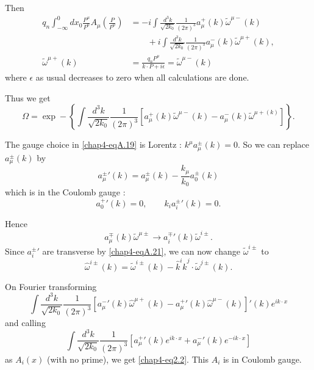 Then
\begin{align*}
  q_n \int^0_{-\infty} dx_0 \frac{P^\mu}{P^0} A_\mu \left( \frac{P}{P^0}\right) & = -i \int \frac{d^3k}{\sqrt{2k_0}} \frac{1}{(2 \pi)^3} a_\mu^+ (k) \tilde{\omega}^{\mu -} (k)\\
  & \qquad + i \int \frac{d^3k}{\sqrt{2k_0}} \frac{1}{(2 \pi)^3} a_\mu^- (k) \tilde{\omega}^{\mu +}(k), \label{chap4-eqA.17}\tag{A.17}\\
  \tilde{\omega}^{\mu +} (k) & = \frac{q_n P^\mu}{k \cdot P + i\epsilon} = {\tilde{\omega}}^{\mu -} (k) \label{chap4-eqA.18}\tag{A.18}
\end{align*}
where $\epsilon$ as usual decreases to zero when all calculations are done.

Thus we get
\begin{equation*}
\Omega = \exp - \left\{ \int \frac{d^3 k}{\sqrt{2k_0}} \frac{1}{(2 \pi)^3} \left[a_\mu^+ (k) \tilde{\omega}^{\mu -} (k) - a_\mu^- (k) \tilde{\omega}^{\mu + (k)} \right]\right\}. \label{chap4-eqA.19}\tag{A.19}
\end{equation*}

The gauge choice in \eqref{chap4-eqA.19} is Lorentz : $k^\mu a_\mu^{\pm} (k) =0$. So we can replace $a_\mu^{\pm} (k)$ by
\begin{equation*}
{a_\mu^{\pm}}' (k) = a_\mu^{\pm} (k) - \frac{k_\mu}{k_0} a_0^\pm (k) \label{chap4-eqA.20}\tag{A.20}
\end{equation*}
which is in the Coulomb gauge :
\begin{equation*}
  {a_0^{+}}' (k) =0, \qquad k_i {a_i^\pm} ' (k) =0. \label{chap4-eqA.21}\tag{A.21}
\end{equation*}

Hence
\begin{equation*}
a_\mu^{\mp} (k) \tilde{\omega}^{\mu \pm} \to {a_i^{\mp}}' (k) \tilde{\omega}^{i \pm}. \label{chap4-eqA.22}\tag{A.22}
\end{equation*}
Since ${a_i^{\pm}}'$ are transverse by \eqref{chap4-eqA.21}, we can now change $\tilde{\omega}^{i \pm }$ to
\begin{equation*}
\hat{\omega}^{i \pm} (k) = \tilde{\omega}^{i \pm} (k) - \hat{k}^{i} \hat{k}^{j} \cdot \tilde{\omega}^{j \pm}(k). \label{chap4-eqA.23}\tag{A.23}
\end{equation*}

On Fourier transforming
\begin{equation*}
\int \frac{d^3k}{\sqrt{2k_0}} \frac{1}{(2 \pi)^3} \left[ {a_\mu^-}' (k) \hat{\omega}^{\mu +} (k) - {a_\mu^+}' (k) \hat{\omega}^{\mu -} (k)\right]' (k) e^{ik \cdot x} \label{chap4-eqA.24}\tag{A.24}
\end{equation*}
and calling
\begin{equation*}
\int \frac{d^3k}{\sqrt{2k_0}} \frac{1}{(2 \pi)^3} \left[ {a_\mu^+}' (k) e^{ik \cdot x} + {a_\mu^-}' (k) e^{-i k \cdot x}\right] \label{chap4-eqA.25}\tag{A.25}
\end{equation*}
as $A_i (x)$ (with no prime), we get \eqref{chap4-eq2.2}. This $A_i$ is in Coulomb gauge.


